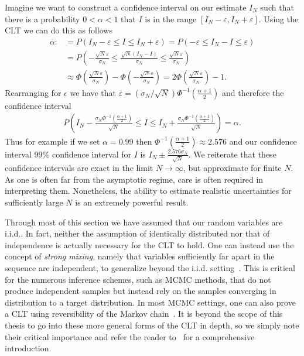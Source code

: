 Imagine we want to construct a confidence interval on our estimate $I_N$ such that there is
a probability $0<\alpha<1$ that $I$ is in the range $[I_N-\varepsilon,I_N+\varepsilon]$.  Using
the CLT we can do this as follows
\begin{align}
	\label{eq:inf:conf-int}
	\alpha :&= P(I_N-\varepsilon \le I \le I_N+\varepsilon ) = P(-\varepsilon \le I_N-I \le \varepsilon) \nonumber\\
	&= P\left(-\frac{\sqrt{N}\varepsilon}{\sigma_N}\le \frac{\sqrt{N}\left(I_N-I\right)}{\sigma_N}
				\le\frac{\sqrt{N}\varepsilon}{\sigma_N}\right) \nonumber\\
	&\approx \Phi\left(\frac{\sqrt{N}\varepsilon}{\sigma_N}\right)-
					\Phi\left(-\frac{\sqrt{N}\varepsilon}{\sigma_N}\right) = 2\Phi\left(\frac{\sqrt{N}\varepsilon}{\sigma_N}\right)-1.
\end{align}
Rearranging for $\epsilon$ we have that 
$\varepsilon = \left(\sigma_N/\sqrt{N}\right)\Phi^{-1}\left(\frac{\alpha+1}{2}\right)$
and therefore the confidence interval
\begin{align}
P\left(I_N-\frac{\sigma_N\Phi^{-1}\left(\frac{\alpha+1}{2}\right)}{\sqrt{N}} 
	\le I \le I_N+\frac{\sigma_N\Phi^{-1}\left(\frac{\alpha+1}{2}\right)}{\sqrt{N}} \right)  = \alpha.
\end{align}
Thus for example if we set $\alpha=0.99$ then $\Phi^{-1}\left(\frac{\alpha+1}{2}\right)\approx 2.576$
and our confidence interval $99\%$ confidence interval for $I$ is
 $I_N \pm \frac{2.576 \sigma_N}{\sqrt{N}}$.  We reiterate that these confidence intervals are exact
 in the limit $N\to\infty$, but approximate for finite $N$.  As one is often far from the asymptotic
 regime, care is often required in interpreting them.  Nonetheless, the ability to
 estimate realistic uncertainties for sufficiently large $N$ is an extremely powerful result.
 
Through most of this section we have assumed that our random variables are i.i.d..
In fact, neither the assumption of identically distributed nor that of independence is actually
necessary for the CLT to hold.  One can instead use the concept of \emph{strong mixing}, namely
that variables sufficiently far apart in the sequence are independent, to generalize beyond the i.i.d.
setting~\citep{jones2004markov}.  This is critical for the numerous \mc inference schemes, 
such as MCMC methods, that
do not produce independent samples but instead rely on the samples converging in distribution
to a target distribution.  In most MCMC settings, one can also prove a CLT using reversibility of
the Markov chain~\citep{kipnis1986central}.
It is beyond the scope of this thesis to go into these more general forms of the CLT
in depth, so we simply note their critical importance and refer the reader to~\cite{durrett2010probability}
for a comprehensive introduction.